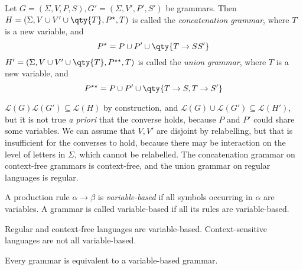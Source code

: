 \begin{definition}
	Let \( G = (\Sigma, V, P, S), G' = (\Sigma, V', P', S') \) be grammars.
	Then \( H = (\Sigma, V \cup V' \cup \qty{T}, P^\star, T) \) is called the \emph{concatenation grammar}, where \( T \) is a new variable, and
	\[ P^\star = P \cup P' \cup \qty{T \to SS'} \]
	\( H' = (\Sigma, V \cup V' \cup \qty{T}, P^{\star\star}, T) \) is called the \emph{union grammar}, where \( T \) is a new variable, and
	\[ P^{\star\star} = P \cup P' \cup \qty{T \to S, T \to S'} \]
\end{definition}
\begin{remark}
	\( \mathcal L(G)\mathcal L(G') \subseteq \mathcal L(H) \) by construction, and \( \mathcal L(G) \cup \mathcal L(G') \subseteq \mathcal L(H') \), but it is not true \emph{a priori} that the converse holds, because \( P \) and \( P' \) could share some variables.
	We can assume that \( V, V' \) are disjoint by relabelling, but that is insufficient for the converses to hold, because there may be interaction on the level of letters in \( \Sigma \), which cannot be relabelled.
	The concatenation grammar on context-free grammars is context-free, and the union grammar on regular languages is regular.
\end{remark}
\begin{definition}
	A production rule \( \alpha \to \beta \) is \emph{variable-based} if all symbols occurring in \( \alpha \) are variables.
	A grammar is called variable-based if all its rules are variable-based.
\end{definition}
\begin{remark}
	Regular and context-free languages are variable-based.
	Context-sensitive languages are not all variable-based.
\end{remark}
\begin{lemma}
	Every grammar is equivalent to a variable-based grammar.
\end{lemma}
